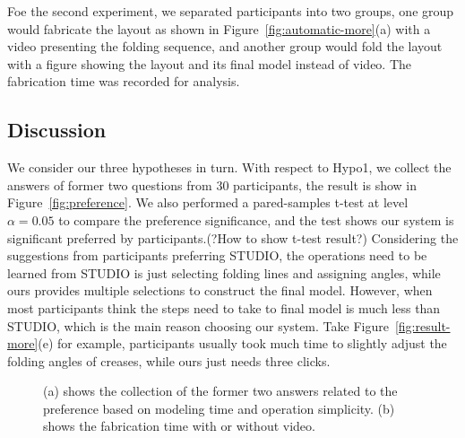 Foe the second experiment, we separated participants into two groups, one group would fabricate the layout as shown in Figure~\ref{fig:automatic-more}(a) with a video presenting the folding sequence, and another group would fold the layout with a figure showing the layout and its final model instead of video. The fabrication time was recorded for analysis. 

\subsection{Discussion}
We consider our three hypotheses in turn. With respect to Hypo1, we collect the answers of former two questions from 30 participants, the result is show in Figure~\ref{fig:preference}. We also performed a pared-samples t-test at level $\alpha = 0.05$ to compare the preference significance, and the test shows our system is significant preferred by participants.(?How to show t-test result?) Considering the suggestions from participants preferring STUDIO, the operations need to be learned from STUDIO is just selecting folding lines and assigning angles, while ours provides multiple selections to construct the final model. However, when most participants think the steps need to take to final model is much less than STUDIO, which is the main reason choosing our system. Take Figure~\ref{fig:result-more}(e) for example, participants usually took much time to slightly adjust the folding angles of creases, while ours just needs three clicks.


\begin{figure}
	\centering
	\vspace{-1ex}
	\caption{(a) shows the collection of the former two answers related to the preference based on modeling time and operation simplicity. (b) shows the fabrication time with or without video.  }
	\label{fig:data}
\end{figure}

